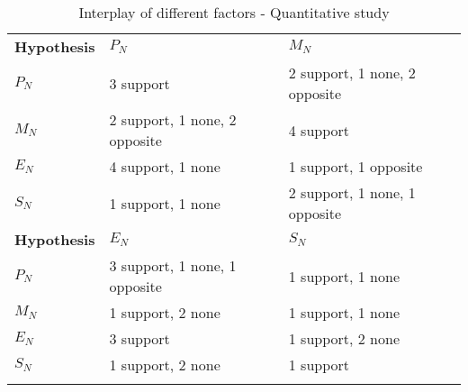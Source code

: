 \documentclass{mcmthesis}
\newlength\savedwidth
\newcommand\whline{\noalign{\global\savedwidth\arrayrulewidth
		\global\arrayrulewidth 1.2pt}%
	\hline
	\noalign{\global\arrayrulewidth\savedwidth}}
\newlength\savewidth
\newcommand\shline{\noalign{\global\savewidth\arrayrulewidth
		\global\arrayrulewidth 1.2pt}%
	\hline
	\noalign{\global\arrayrulewidth\savewidth}}
\begin{document}
	\begin{table}[htbp]
		\renewcommand\arraystretch{1.5}
		\footnotesize
		\centering
		\begin{tabular}{m{2.7cm}<{\centering}|m{5cm}<{\centering}|m{5cm}<{\centering}}
			\whline
			\textbf{Hypothesis}&\textbf{$P_N$}&\textbf{$M_N$}\\
			\whline
			\textbf{$P_N$}&3 support &2 support, 1 none, 2 opposite\\
			
			\textbf{$M_N$}&2 support, 1 none, 2 opposite&4 support\\
			
			\textbf{$E_N$}&4 support, 1 none&1 support, 1 opposite\\
			
			\textbf{$S_N$}&1 support, 1 none&2 support, 1 none, 1 opposite\\
			\shline
			\textbf{Hypothesis}&\textbf{$E_N$}&\textbf{$S_N$}\\
			\whline
			\textbf{$P_N$}& 3 support, 1 none, 1 opposite & 1 support, 1 none\\
			
			\textbf{$M_N$}&1 support, 2 none&1 support, 1 none\\
			
			\textbf{$E_N$}&3 support&1 support, 2 none\\
			
			\textbf{$S_N$}&1 support, 2 none&1 support\\
			\shline
		\end{tabular}
		\caption{Interplay of different factors - Quantitative study}\label{tab:Interplay of different factors - Quantitative study}
	\end{table}
	
\end{document}
